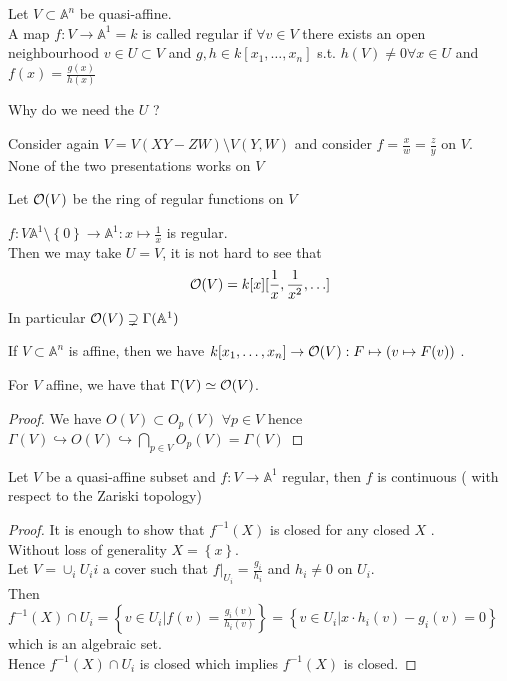 \documentclass[../main.tex]{subfiles}
\begin{document}
\begin{defn}
	Let $V \subset \mathbb{A}^{n}$ be quasi-affine.\\
	A map $f:V\to \mathbb{A}^{1}=k$ is called regular if $\forall v \in V$ there exists an open neighbourhood $v\in U \subset V$ and $g,h\in k[x_1,\ldots,x_n]$ s.t. $h( V) \neq 0 \forall x \in U$ and $f( x) = \frac{g( x) }{h( x) }$ 
\end{defn}
Why do we need the $U$ ?
\begin{exemple}
Consider again $V= V( XY-ZW) \setminus V( Y,W) $ and consider $f= \frac{x}{w}= \frac{z}{y}$ on $V$.\\
None of the two presentations works on $V$ 
\end{exemple}
\begin{defn}
	Let $\mathcal{O}( V) $ be the ring of regular functions on $V$ 
\end{defn}
\begin{rmq}
$f: V \mathbb{A}^{1}\setminus \left\{ 0 \right\} \to \mathbb{A}^{1}: x\mapsto \frac{1}{x}$ is regular.\\
Then we may take $U=V$, it is not hard to see that
\[ 
	\mathcal{O}( V) = k[x] [ \frac{1}{x},\frac{1}{x^{2}},\ldots] 
\]
In particular $\mathcal{O}( V) \supsetneq \Gamma( \mathbb{A}^{1}) $ 
\end{rmq}
If $V \subset \mathbb{A}^{n}$ is affine, then we have $ k[x_1,\ldots,x_n]\to \mathcal{O}( V): F \mapsto \left( v\mapsto F( v) \right)  $ .\\
\begin{propo}
For $V$ affine, we have that $\Gamma( V) \simeq \mathcal{O}( V) $.
\end{propo}
\begin{proof}
We have $O( V) \subset O_p(V ) $ $\forall p\in V$ hence $\Gamma( V) \hookrightarrow O( V) \hookrightarrow \bigcap_{p\in V} O_p( V) = \Gamma( V) $ 
\end{proof}
\begin{lemma}
Let $V$ be a quasi-affine subset and $f:V\to \mathbb{A}^{1}$ regular, then $f$ is continuous ( with respect to the Zariski topology) 
\end{lemma}
\begin{proof}
It is enough to show that $f^{-1}( X) $ is closed for any closed $X$ .\\
Without loss of generality $X= \left\{ x \right\} $.\\
Let $V = \cup_i U_ii$ a cover such that $f|_{U_i} = \frac{g_i}{h_i}$ and $h_i\neq 0$ on $U_i$.\\
Then $f^{-1}( X) \cap U_i = \left\{ v\in U_i | f( v) = \frac{g_i( v) }{h_i( v) } \right\}= \left\{ v\in U_i| x\cdot h_i( v) - g_i( v) =0 \right\}  $ which is an algebraic set.\\
Hence $f^{-1}( X) \cap U_i$ is closed which implies $f^{-1}( X) $ is closed.
\end{proof}
\end{document}
